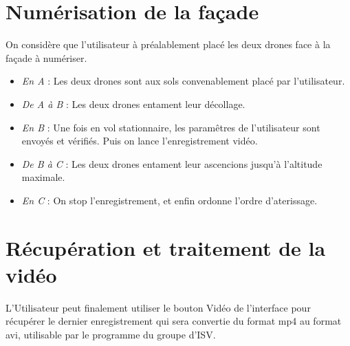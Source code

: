 \documentclass[12pt, openany]{report}
\begin{document}
\section{Numérisation de la façade}

On considère que l'utilisateur à préalablement placé les deux drones face à la façade à numériser.

\begin{itemize}
\item \textit{En A} : Les deux drones sont aux sols convenablement placé par l'utilisateur.
\item \textit{De A à B} : Les deux drones entament leur décollage.
\item \textit{En B} : Une fois en vol stationnaire, les paramêtres de l'utilisateur sont envoyés et vérifiés. Puis on lance l'enregistrement vidéo. 
\item \textit{De B à C} : Les deux drones entament leur ascencions jusqu'à l'altitude maximale.
\item \textit{En C} : On stop l'enregistrement, et enfin ordonne l'ordre d'aterissage.
\end{itemize}



\section{Récupération et traitement de la vidéo}

L'Utilisateur peut finalement utiliser le bouton Vidéo de l'interface pour récupérer le dernier enregistrement qui sera convertie du format mp4 au format avi, utilisable par le programme du groupe d'ISV.
\end{document}
